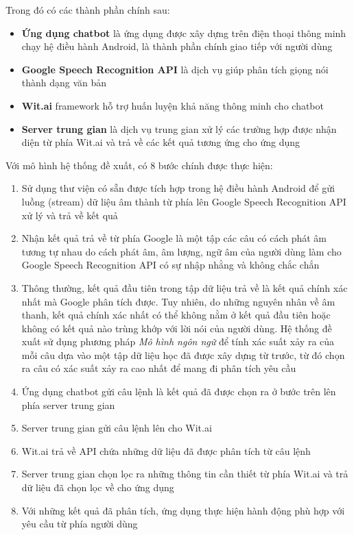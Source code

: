 \documentclass[12pt]{report}
\begin{document}
\noindent Trong đó có các thành phần chính sau:

\begin{itemize}
	\item \textbf{Ứng dụng chatbot} là ứng dụng được xây dựng trên điện thoại thông minh chạy hệ điều hành Android, là thành phần chính giao tiếp với người dùng
	\item \textbf{Google Speech Recognition API} là dịch vụ giúp phân tích giọng nói thành dạng văn bản
	\item \textbf{Wit.ai} framework hỗ trợ huấn luyện khả năng thông minh cho chatbot
	\item \textbf{Server trung gian} là dịch vụ trung gian xử lý các trường hợp được nhận diện từ phía Wit.ai và trả về các kết quả tương ứng cho ứng dụng
\end{itemize}

\noindent Với mô hình hệ thống đề xuất, có 8 bước chính được thực hiện:

\begin{enumerate}
	\item Sử dụng thư viện có sẵn được tích hợp trong hệ điều hành Android để gửi luồng (stream) dữ liệu âm thành từ phía lên Google Speech Recognition API xử lý và trả về kết quả
	\item Nhận kết quả trả về từ phía Google là một tập các câu có cách phát âm tương tự nhau do cách phát âm, âm lượng, ngữ âm của người dùng làm cho Google Speech Recognition API có sự nhập nhằng và không chắc chắn
	\item Thông thường, kết quả đầu tiên trong tập dữ liệu trả về là kết quả chính xác nhất mà Google phân tích được. Tuy nhiên, do những nguyên nhân về âm thanh, kết quả chính xác nhất có thể không nằm ở kết quả đầu tiên hoặc không có kết quả nào trùng khớp với lời nói của người dùng. Hệ thống đề xuất sử dụng phương pháp \textit{Mô hình ngôn ngữ} để tính xác suất xảy ra của mỗi câu dựa vào một tập dữ liệu học đã được xây dựng từ trước, từ đó chọn ra câu có xác suất xảy ra cao nhất để mang đi phân tích yêu cầu
	\item Ứng dụng chatbot gửi câu lệnh là kết quả đã được chọn ra ở bước trên lên phía server trung gian
	\item Server trung gian gửi câu lệnh lên cho Wit.ai
	\item Wit.ai trả về API chứa những dữ liệu đã được phân tích từ câu lệnh
	\item Server trung gian chọn lọc ra những thông tin cần thiết từ phía Wit.ai và trả dữ liệu đã chọn lọc về cho ứng dụng
	\item Với những kết quả đã phân tích, ứng dụng thực hiện hành động phù hợp với yêu cầu từ phía người dùng
\end{enumerate}
\end{document}
